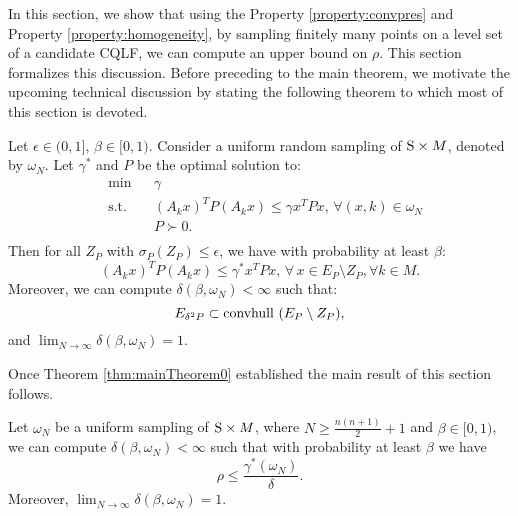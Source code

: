 In this section, we show that using the Property \ref{property:convpres} and Property \ref{property:homogeneity}, by sampling finitely many points on a level set of a candidate CQLF, we can compute an upper bound on $\rho$. This section formalizes this discussion. Before preceding to the main theorem, we motivate the upcoming technical discussion by stating the following theorem to which most of this section is devoted.

\begin{theorem} \label{thm:mainTheorem0} Let $\epsilon \in (0,1]$, $\beta \in [0,1)$. Consider a uniform random sampling of $\text{S} \times M$, denoted by $\omega_N$. Let $\gamma^*$ and $P$ be the optimal solution to:
\begin{equation}\label{eqn:campiOpt01}
\begin{aligned}
& \text{min} & & \gamma \\
& \text{s.t.} 
&  & (A_k x)^TP(A_k x) \leq \gamma x^TPx,\,\forall (x,k) \in \omega_N \\
& && P \succ 0. \\
\end{aligned}
\end{equation}
Then for all $Z_P$ with $\sigma_P(Z_P)\leq \epsilon$, we have with probability at least $\beta$:
\begin{equation} \label{eqn:exceptEps}(A_k x)^TP(A_k x)\leq \gamma^*x^TPx,\,\forall\, x \in E_P \setminus Z_P, \forall k \in M.\end{equation}
Moreover, we can compute $\delta(\beta, \omega_N) < \infty$  such that:
\begin{equation}\label{eqn:contraction}E_{\delta^2P} \subset  \mbox{convhull } (E_{P} \setminus Z_{P}),
\end{equation}
and $\lim_{N \to \infty} \delta(\beta, \omega_N) = 1.$
\end{theorem}

Once Theorem \ref{thm:mainTheorem0} established the main result of this section follows.

\begin{theorem} \label{thm:mainTheorem} Let $\omega_N$ be a uniform sampling of $\text{S} \times M$, where $N \geq \frac{n(n+1)}{2}+1$ and $\beta \in [0,1)$, we can compute $\delta(\beta, \omega_N) < \infty$ such that with probability at least $\beta$ we have $$\rho \leq \frac{\gamma^*(\omega_N)}{\delta}.$$ Moreover, $\lim_{N \to \infty} \delta(\beta, \omega_N) = 1$.
\end{theorem}

